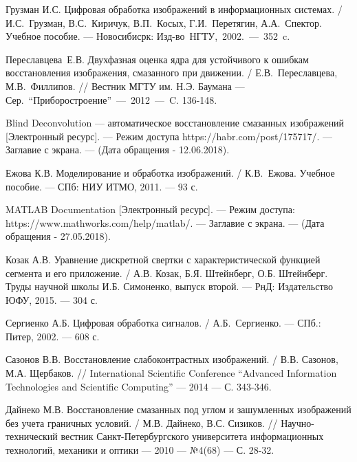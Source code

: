 \documentclass[a4paper]{article}
\theoremstyle{definition}
\begin{document}
\begin{thebibliography}{9}
Грузман И.С. Цифровая обработка изображений в информационных системах. / И.С.~Грузман, В.С.~Киричук, В.П.~Косых, Г.И.~Перетягин, А.А.~Спектор. Учебное пособие. --- Новосибисрк: Изд-во~НГТУ,~2002.~---~352~c.

Переславцева~Е.В. Двухфазная оценка ядра для устойчивого к ошибкам восстановления изображения, смазанного при движении. / Е.В.~Переславцева, М.В.~Филлипов. // Вестник МГТУ им. Н.Э. Баумана --- Сер.~``Приборостроение''~---~2012~---~C. 136-148.

Blind Deconvolution --- автоматическое восстановление смазанных изображений [Электронный ресурс]. --- Режим доступа https://habr.com/post/175717/. --- Заглавие с экрана. --- (Дата обращения - 12.06.2018).

Ежова К.В. Моделирование и обработка изображений. / К.В.~Ежова. Учебное пособие. --- СПб: НИУ ИТМО, 2011. --- 93 с.

MATLAB Documentation [Электронный ресурс]. --- Режим доступа: https://www.mathworks.com/help/matlab/. --- Заглавие с экрана. --- (Дата обращения - 27.05.2018).

Козак А.В. Уравнение дискретной свертки с характеристической функцией сегмента и его приложение. / А.В. Козак, Б.Я. Штейнберг, О.Б. Штейнберг. Труды научной школы И.Б. Симоненко, выпуск второй. --- РнД: Издательство ЮФУ, 2015. --- 304 с.

Сергиенко А.Б. Цифровая обработка сигналов. / А.Б.~Сергиенко. --- СПб.: Питер, 2002. --- 608 с.

Сазонов В.В. Восстановление слабоконтрастных изображений. / В.В. Сазонов, М.А. Щербаков. // International Scientific Conference
``Advanced Information Technologies and Scientific Computing'' --- 2014 --- С. 343-346.

Дайнеко М.В. Восстановление смазанных под углом и зашумленных изображений без учета граничных условий. / М.В. Дайнеко, В.С. Сизиков. // Научно-технический вестник Санкт-Петербургского университета информационных технологий, механики и оптики --- 2010 --- №4(68) --- С. 28-32.

\end{thebibliography}
\end{document}
